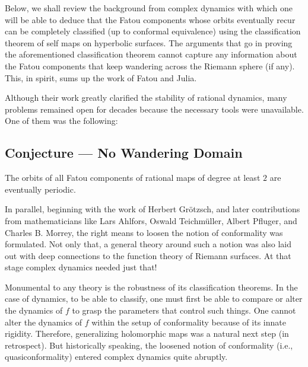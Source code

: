 \documentclass[11pt,a4paper]{article}
\begin{document}

        Below, we shall review the background from complex dynamics with which one will be able to deduce that the Fatou components whose orbits eventually recur can be completely classified (up to conformal equivalence) using the classification theorem of self maps on hyperbolic surfaces. The arguments that go in proving the aforementioned classification theorem cannot capture any information about the Fatou components that keep wandering across the Riemann sphere (if any). This, in spirit, sums up the work of Fatou and Julia.

        Although their work greatly clarified the stability of rational dynamics, many problems remained open for decades because the necessary tools were unavailable. One of them was the following:

        \subsection*{Conjecture — No Wandering Domain} The orbits of all Fatou components of rational maps of degree at least $2$ are eventually periodic.


        In parallel, beginning with the work of Herbert Gr\"otzsch, and later contributions from mathematicians like Lars Ahlfors, Oswald Teichm\"uller, Albert Pfluger, and Charles B. Morrey, the right means to loosen the notion of conformality was formulated. Not only that, a general theory around such a notion was also laid out with deep connections to the function theory of Riemann surfaces. At that stage complex dynamics needed just that!

        Monumental to any theory is the robustness of its classification theorems. In the case of dynamics, to be able to classify, one must first be able to compare or alter the dynamics of $f$ to grasp the parameters that control such things. One cannot alter the dynamics of $f$ within the setup of conformality because of its innate rigidity. Therefore, generalizing holomorphic maps was a natural next step (in retrospect). But historically speaking, the loosened notion of conformality (i.e., quasiconformality) entered complex dynamics quite abruptly.
\end{document}
